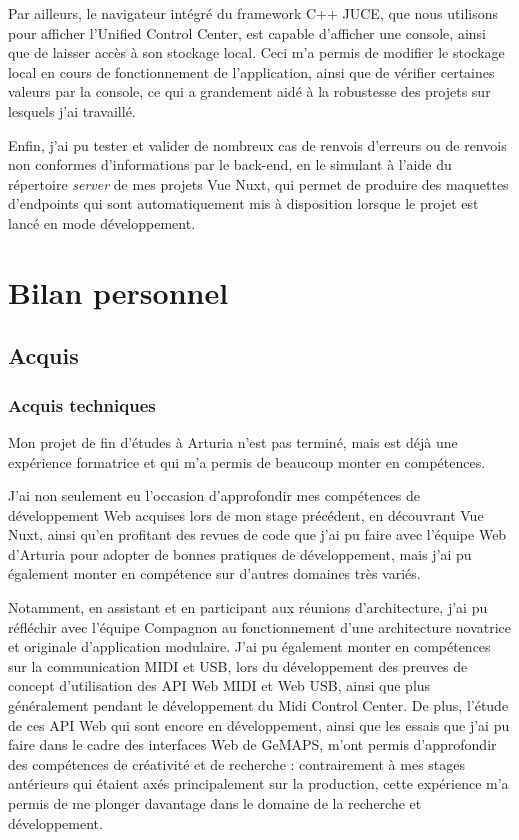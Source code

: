\documentclass[francais]{rapportPFE}  %
\begin{document}
Par ailleurs, le navigateur intégré du framework C++ JUCE, que nous utilisons pour afficher l'Unified Control Center, est capable d'afficher une console, ainsi que de laisser accès à son stockage local. Ceci m'a permis de modifier le stockage local en cours de fonctionnement de l'application, ainsi que de vérifier certaines valeurs par la console, ce qui a grandement aidé à la robustesse des projets sur lesquels j'ai travaillé.

Enfin, j'ai pu tester et valider de nombreux cas de renvois d'erreurs ou de renvois non conformes d'informations par le back-end, en le simulant à l'aide du répertoire \textit{server} de mes projets Vue Nuxt, qui permet de produire des maquettes d'endpoints qui sont automatiquement mis à disposition lorsque le projet est lancé en mode développement.

\section{Bilan personnel}
\subsection{Acquis}
\subsubsection{Acquis techniques}

Mon projet de fin d'études à Arturia n'est pas terminé, mais est déjà une expérience formatrice et qui m'a permis de beaucoup monter en compétences. 

J'ai non seulement eu l'occasion d'approfondir mes compétences de développement Web acquises lors de mon stage précédent, en découvrant Vue Nuxt, ainsi qu'en profitant des revues de code que j'ai pu faire avec l'équipe Web d'Arturia pour adopter de bonnes pratiques de développement, mais j'ai pu également monter en compétence sur d'autres domaines très variés. 

Notamment, en assistant et en participant aux réunions d'architecture, j'ai pu réfléchir avec l'équipe Compagnon au fonctionnement d'une architecture novatrice et originale d'application modulaire. J'ai pu également monter en compétences sur la communication MIDI et USB, lors du développement des preuves de concept d'utilisation des API Web MIDI et Web USB, ainsi que plus généralement pendant le développement du Midi Control Center. De plus, l'étude de ces API Web qui sont encore en développement, ainsi que les essais que j'ai pu faire dans le cadre des interfaces Web de GeMAPS, m'ont permis d'approfondir des compétences de créativité et de recherche : contrairement à mes stages antérieurs qui étaient axés principalement sur la production, cette expérience m'a permis de me plonger davantage dans le domaine de la recherche et développement.
\end{document}
